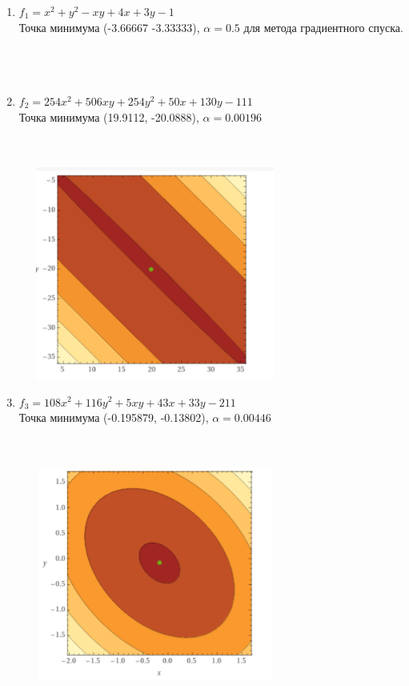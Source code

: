 \begin{enumerate}
	\item \(f_1 = x^2 + y^2 - xy + 4x + 3y - 1\) \\
	Точка минимума (-3.66667 -3.33333), $\alpha = 0.5$ для метода градиентного спуска. \\
	\\
	 \\
	\
	
	
	\item \(f_2 = 254x^2 + 506xy + 254y^2 + 50x + 130y - 111\) \\
	Точка минимума (19.9112, -20.0888), $\alpha = 0.00196$ \\
	\\
	 \\
	
	\begin{center}
		\includegraphics[width=9cm, height=7cm]{img/f2.png}
	\end{center}

	\item \(f_3 = 108x^2 + 116y^2 + 5xy + 43x + 33y - 211\) \\
	Точка минимума (-0.195879, -0.13802), $\alpha = 0.00446$  \\
	\\
	 \\
	\begin{center}
		\includegraphics[width=9cm, height=7cm]{img/f3.png}
	\end{center}

\end{enumerate}

